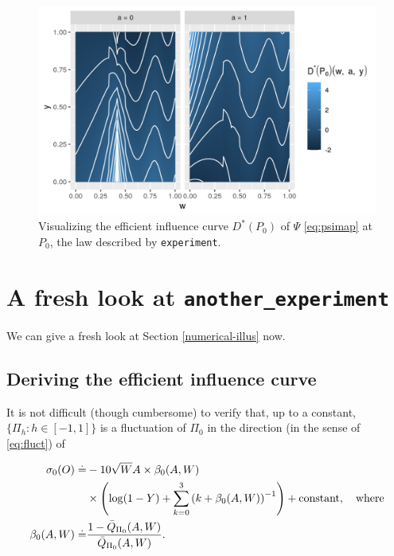 \documentclass[
  11pt,
  openright,twoside]{book}
\newcommand{\defq}{\doteq}
\newcommand{\Qbar}{\bar{Q}}
\theoremstyle{definition}
\theoremstyle{definition}
\theoremstyle{definition}
\theoremstyle{definition}
\theoremstyle{remark}
\begin{document}
\begin{figure}

{\centering \includegraphics[width=0.8\linewidth]{img/eic-three-1} 

}

\caption{Visualizing the efficient influence curve \(D^{*}(P_{0})\) of \(\Psi\) \eqref{eq:psimap} at \(P_{0}\), the law described by \texttt{experiment}.}\label{fig:eic-three}
\end{figure}

\hypertarget{revisiting}{%
\section{\texorpdfstring{A fresh look at \texttt{another\_experiment}}{A fresh look at another\_experiment}}\label{revisiting}}

We can give a fresh look at Section \ref{numerical-illus} now.

\hypertarget{deriving-the-efficient-influence-curve}{%
\subsection{Deriving the efficient influence curve}\label{deriving-the-efficient-influence-curve}}

It is not difficult (though cumbersome) to verify that, up to a constant,
\(\{\Pi_{h} : h \in [-1,1]\}\) is a fluctuation of \(\Pi_{0}\) in the direction
(in the sense of \eqref{eq:fluct}) of

\begin{align}
\notag\sigma_{0}(O)  \defq &- 10 \sqrt{W} A \times \beta_{0}  (A,W)\\
&\times\left(\log(1    -     Y)    +     \sum_{k=0}^{3}    \left(k     +    \beta_{0}
(A,W)\right)^{-1}\right) + \text{constant}, \quad \text{where}\\
\beta_{0}(A,W)\defq & \frac{1
-\Qbar_{\Pi_{0}}(A,W)}{\Qbar_{\Pi_{0}}(A,W)}. \label{eq:sigma0}\end{align}
\end{document}
